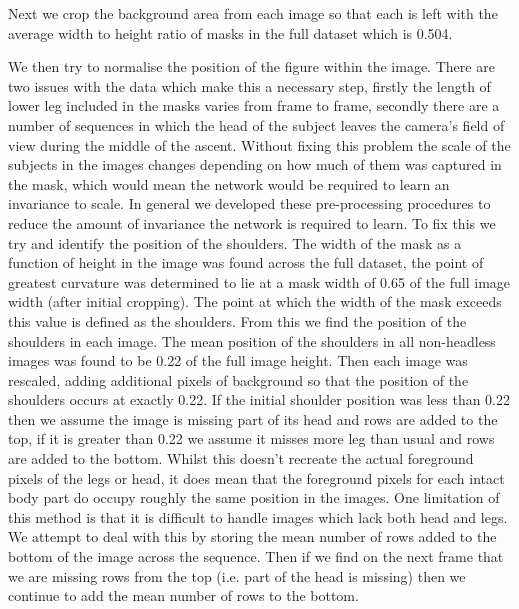 \documentclass[11pt]{article} %
\begin{document}
Next we crop the background area from each image so that each is left with the average width to height ratio of masks in the full dataset which is 0.504.

We then try to normalise the position of the figure within the image. There are two issues with the data which make this a necessary step, firstly the length of lower leg included in the masks varies from frame to frame, secondly there are a number of sequences in which the head of the subject leaves the camera's field of view during the middle of the ascent. Without fixing this problem the scale of the subjects in the images changes depending on how much of them was captured in the mask, which would mean the network would be required to learn an invariance to scale. In general we developed these pre-processing procedures to reduce the amount of invariance the network is required to learn. To fix this we try and identify the position of the shoulders. The width of the mask as a function of height in the image was found across the full dataset, the point of greatest curvature was determined to lie at a mask width of 0.65 of the full image width (after initial cropping). The point at which the width of the mask exceeds this value is defined as the shoulders. From this we find the position of the shoulders in each image. The mean position of the shoulders in all non-headless images was found to be 0.22 of the full image height. Then each image was rescaled, adding additional pixels of background so that the position of the shoulders occurs at exactly 0.22. If the initial shoulder position was less than 0.22 then we assume the image is missing part of its head and rows are added to the top, if it is greater than 0.22 we assume it misses more leg than usual and rows are added to the bottom. Whilst this doesn't recreate the actual foreground pixels of the legs or head, it does mean that the foreground pixels for each intact body part do occupy roughly the same position in the images. One limitation of this method is that it is difficult to handle images which lack both head and legs. We attempt to deal with this by storing the mean number of rows added to the bottom of the image across the sequence. Then if we find on the next frame that we are missing rows from the top (i.e. part of the head is missing) then we continue to add the mean number of rows to the bottom.
\end{document}
